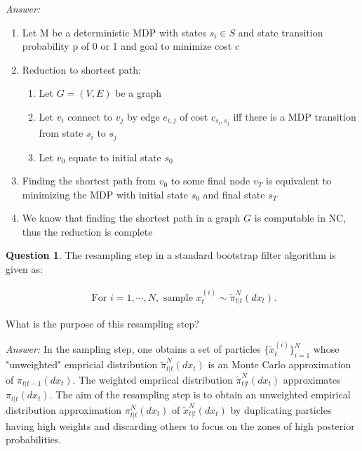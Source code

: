 \documentclass{article}
\theoremstyle{definition}
\newtheorem{question}[thm]{Question}
\newenvironment{answer}{\noindent\textit{Answer:}}{}
\begin{document}
\begin{answer}
    \begin{enumerate}
        \item Let M be a deterministic MDP with states $s_i \in S$ and state transition probability p of 0 or 1 and goal to minimize cost c
        \item Reduction to shortest path:
            \begin{enumerate}
                \item Let $G=(V,E)$ be a graph
                \item Let $v_i$ connect to $v_j$ by edge $e_{i,j}$ of cost $c_{s_i,s_j}$ iff there is a MDP transition from state $s_i$ to $s_j$ 
                \item Let $v_0$ equate to initial state $s_0$ 
            \end{enumerate}
        \item Finding the shortest path from $v_0$ to some final node $v_T$ is equivalent to minimizing the MDP with initial state $s_0$ and final state $s_T$
        \item We know that finding the shortest path in a graph $G$ is computable in NC, thus the reduction is complete
    \end{enumerate}
\end{answer}

\begin{question}
    The resampling step in a standard bootstrap filter algorithm is given as:

\begin{align}
    \text{ For } i = 1, \cdots, N, \text{ sample } x_t^{(i)} \sim \tilde{\pi}_{t|t}^N(dx_t).
\end{align}

What is the purpose of this resampling step?
\end{question}

\begin{answer}
    In the sampling step, one obtains a set of particles $\{\tilde{x}_t^{(i)}\}^N_{i=1}$ whose "unweighted" empricial distribution $\tilde{\pi}_{t|t}^N(dx_t)$ is an Monte Carlo approximation of $\pi_{t|t-1}(dx_t)$. The weighted empriical distribution $\tilde{\pi}_{t|t}^{N}(dx_t)$ approximates $\pi_{t|t}(dx_t)$. The aim of the resampling step is to obtain an unweighted empirical distribution approximation $\pi_{t|t}^N(dx_t)$ of $\tilde{x}_{t|t}^N(dx_t)$ by duplicating particles having high weights and discarding others to focus on the zones of high posterior probabilities.
\end{answer}
\end{document}
